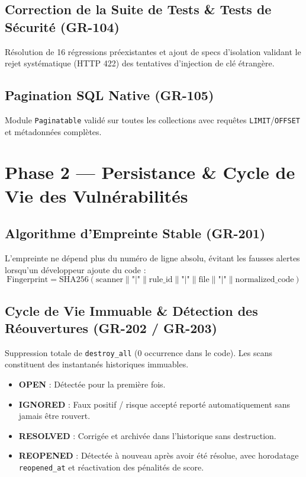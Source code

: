 \documentclass[11pt,a4paper]{article}
\begin{document}
\subsection{Correction de la Suite de Tests \& Tests de Sécurité (GR-104)}
Résolution de 16 régressions préexistantes et ajout de specs d'isolation validant le rejet systématique (HTTP 422) des tentatives d'injection de clé étrangère.

\subsection{Pagination SQL Native (GR-105)}
Module \texttt{Paginatable} validé sur toutes les collections avec requêtes \texttt{LIMIT}/\texttt{OFFSET} et métadonnées complètes.

\section{Phase 2 — Persistance \& Cycle de Vie des Vulnérabilités}

\subsection{Algorithme d'Empreinte Stable (GR-201)}
L'empreinte ne dépend plus du numéro de ligne absolu, évitant les fausses alertes lorsqu'un développeur ajoute du code :
\begin{equation}
\text{Fingerprint} = \text{SHA256}(\text{scanner} \parallel \text{"|"} \parallel \text{rule\_id} \parallel \text{"|"} \parallel \text{file} \parallel \text{"|"} \parallel \text{normalized\_code})
\end{equation}

\subsection{Cycle de Vie Immuable \& Détection des Réouvertures (GR-202 / GR-203)}
Suppression totale de \texttt{destroy\_all} (0 occurrence dans le code). Les scans constituent des instantanés historiques immuables.
\begin{itemize}
    \item \textbf{OPEN} : Détectée pour la première fois.
    \item \textbf{IGNORED} : Faux positif / risque accepté reporté automatiquement sans jamais être rouvert.
    \item \textbf{RESOLVED} : Corrigée et archivée dans l'historique sans destruction.
    \item \textbf{REOPENED} : Détectée à nouveau après avoir été résolue, avec horodatage \texttt{reopened\_at} et réactivation des pénalités de score.
\end{itemize}
\end{document}

